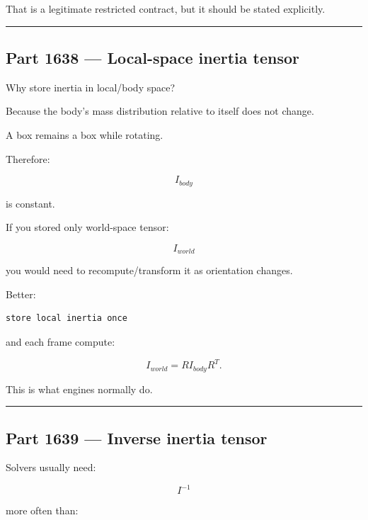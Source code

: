 That is a legitimate restricted contract, but it should be stated explicitly.

\begin{center}\rule{0.5\linewidth}{0.5pt}\end{center}

\subsection{Part 1638 --- Local-space inertia tensor}\label{06-engine-ii-ch035-part-1638-local-space-inertia-tensor}

\hypertarget{06-engine-ii-ch035-part-1638-local-space-inertia-tensor}{}

Why store inertia in local/body space?

Because the body's mass distribution relative to itself does not change.

A box remains a box while rotating.

Therefore:

\[
I_{body}
\]

is constant.

If you stored only world-space tensor:

\[
I_{world}
\]

you would need to recompute/transform it as orientation changes.

Better:

\begin{verbatim}
store local inertia once
\end{verbatim}

and each frame compute:

\[
I_{world}
=
RI_{body}R^T.
\]

This is what engines normally do.

\begin{center}\rule{0.5\linewidth}{0.5pt}\end{center}

\subsection{Part 1639 --- Inverse inertia tensor}\label{06-engine-ii-ch035-part-1639-inverse-inertia-tensor}

\hypertarget{06-engine-ii-ch035-part-1639-inverse-inertia-tensor}{}

Solvers usually need:

\[
I^{-1}
\]

more often than:

